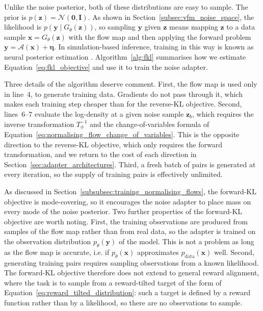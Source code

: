 \documentclass[12pt,a4paper]{report}
\begin{document}
Unlike the noise posterior, both of these distributions are easy to sample. The prior is $p(\mathbf{z})=\mathcal{N}(\mathbf{0},\mathbf{I})$. As shown in Section~\ref{subsec:vfm_noise_space}, the likelihood is $p(\mathbf{y}\mid G_{\theta}(\mathbf{z}))$, so sampling $\mathbf{y}$ given $\mathbf{z}$ means mapping $\mathbf{z}$ to a data sample $\mathbf{x}=G_{\theta}(\mathbf{z})$ with the flow map and then applying the forward problem $\mathbf{y}=\mathcal{A}(\mathbf{x})+\boldsymbol{\eta}$. In simulation-based inference, training in this way is known as neural posterior estimation \parencite{papamakarios2016fastepsilonfree}. Algorithm~\ref{alg:fkl} summarises how we estimate Equation~\ref{eq:fkl_objective} and use it to train the noise adapter.

Three details of the algorithm deserve comment. First, the flow map is used only in line~4, to generate training data. Gradients do not pass through it, which makes each training step cheaper than for the reverse-KL objective. Second, lines~6--7 evaluate the log-density at a given noise sample $\mathbf{z}_b$, which requires the inverse transformation $T_{\phi}^{-1}$ and the change-of-variables formula of Equation~\ref{eq:normalising_flow_change_of_variables}. This is the opposite direction to the reverse-KL objective, which only requires the forward transformation, and we return to the cost of each direction in Section~\ref{sec:adapter_architectures}. Third, a fresh batch of pairs is generated at every iteration, so the supply of training pairs is effectively unlimited.

As discussed in Section~\ref{subsubsec:training_normalising_flows}, the forward-KL objective is mode-covering, so it encourages the noise adapter to place mass on every mode of the noise posterior. 
Two further properties of the forward-KL objective are worth noting. First, the training observations are produced from samples of the flow map rather than from real data, so the adapter is trained on the observation distribution $p_{\theta}(\mathbf{y})$ of the model. This is not a problem as long as the flow map is accurate, i.e. if $p_{\theta}(\mathbf{x})$ approximates $p_{\mathrm{data}}(\mathbf{x})$ well. Second, generating training pairs requires sampling observations from a known likelihood. The forward-KL objective therefore does not extend to general reward alignment, where the task is to sample from a reward-tilted target of the form of Equation~\ref{eq:reward_tilted_distribution}: such a target is defined by a reward function rather than by a likelihood, so there are no observations to sample.
\end{document}
